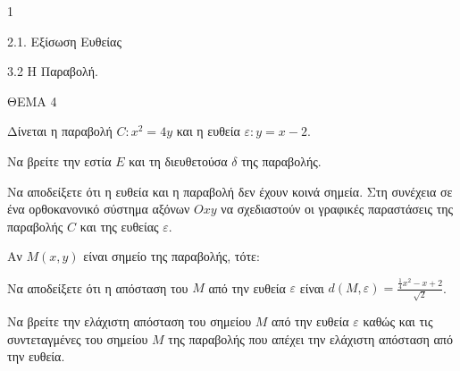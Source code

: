 \begin{ylh}{1}
    \item 2.1. Εξίσωση Ευθείας
    \item 3.2 Η Παραβολή.
\end{ylh}
ΘΕΜΑ 4

Δίνεται η παραβολή $C: x^2=4y$ και η ευθεία $\varepsilon: y=x-2$.
\begin{alist}
\item Να βρείτε την εστία $E$ και τη διευθετούσα $\delta$ της παραβολής. 
\item Να αποδείξετε ότι η ευθεία και η παραβολή δεν έχουν κοινά σημεία. Στη συνέχεια σε ένα ορθοκανονικό σύστημα αξόνων $Oxy$ να σχεδιαστούν οι γραφικές παραστάσεις της παραβολής $C$ και της ευθείας $\varepsilon$. 
\item Αν $M(x,y)$ είναι σημείο της παραβολής, τότε:
    \begin{rlist}
    \item Να αποδείξετε ότι η απόσταση του $M$ από την ευθεία $\varepsilon$ είναι $d(M,\varepsilon) = \frac{\frac{1}{4}x^2-x+2}{\sqrt{2}}$. 
    \item Να βρείτε την ελάχιστη απόσταση του σημείου $M$ από την ευθεία $\varepsilon$ καθώς και τις συντεταγμένες του σημείου $M$ της παραβολής που απέχει την ελάχιστη απόσταση από την ευθεία. 
    \end{rlist}
\end{alist}